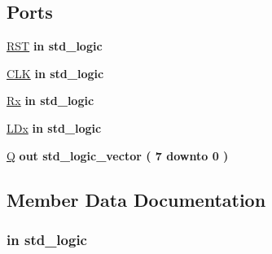 \subsection*{Ports}
 \begin{DoxyCompactItemize}
\item 
\hyperlink{class_reg_ser_par_a98682ef7de2714e5bab788a2e2ff1b7f}{R\+S\+T}  {\bfseries {\bfseries \textcolor{keywordflow}{in}\textcolor{vhdlchar}{ }}} {\bfseries \textcolor{comment}{std\+\_\+logic}\textcolor{vhdlchar}{ }} 
\item 
\hyperlink{class_reg_ser_par_ab5d0ea9e968d49d94da9db07a979d402}{C\+L\+K}  {\bfseries {\bfseries \textcolor{keywordflow}{in}\textcolor{vhdlchar}{ }}} {\bfseries \textcolor{comment}{std\+\_\+logic}\textcolor{vhdlchar}{ }} 
\item 
\hyperlink{class_reg_ser_par_a5b7b5dfa3fdd403b397fc3a20f75ec69}{Rx}  {\bfseries {\bfseries \textcolor{keywordflow}{in}\textcolor{vhdlchar}{ }}} {\bfseries \textcolor{comment}{std\+\_\+logic}\textcolor{vhdlchar}{ }} 
\item 
\hyperlink{class_reg_ser_par_a69819e62c0ed2812974c0d7386530300}{L\+Dx}  {\bfseries {\bfseries \textcolor{keywordflow}{in}\textcolor{vhdlchar}{ }}} {\bfseries \textcolor{comment}{std\+\_\+logic}\textcolor{vhdlchar}{ }} 
\item 
\hyperlink{class_reg_ser_par_a6ff2f01a18f0e3227cda944596622e86}{Q}  {\bfseries {\bfseries \textcolor{keywordflow}{out}\textcolor{vhdlchar}{ }}} {\bfseries \textcolor{comment}{std\+\_\+logic\+\_\+vector}\textcolor{vhdlchar}{ }\textcolor{vhdlchar}{(}\textcolor{vhdlchar}{ }\textcolor{vhdlchar}{ } \textcolor{vhdldigit}{7} \textcolor{vhdlchar}{ }\textcolor{keywordflow}{downto}\textcolor{vhdlchar}{ }\textcolor{vhdlchar}{ } \textcolor{vhdldigit}{0} \textcolor{vhdlchar}{ }\textcolor{vhdlchar}{)}\textcolor{vhdlchar}{ }} 
\end{DoxyCompactItemize}


\subsection{Member Data Documentation}
\hypertarget{class_reg_ser_par_ab5d0ea9e968d49d94da9db07a979d402}{}
\subsubsection[{C\+L\+K}]{ {\bfseries \textcolor{keywordflow}{in}\textcolor{vhdlchar}{ }} {\bfseries \textcolor{comment}{std\+\_\+logic}\textcolor{vhdlchar}{ }} \hspace{0.3cm}{\ttfamily [Port]}}\label{class_reg_ser_par_ab5d0ea9e968d49d94da9db07a979d402}
\hypertarget{class_reg_ser_par_ae4f03c286607f3181e16b9aa12d0c6d4}{}
